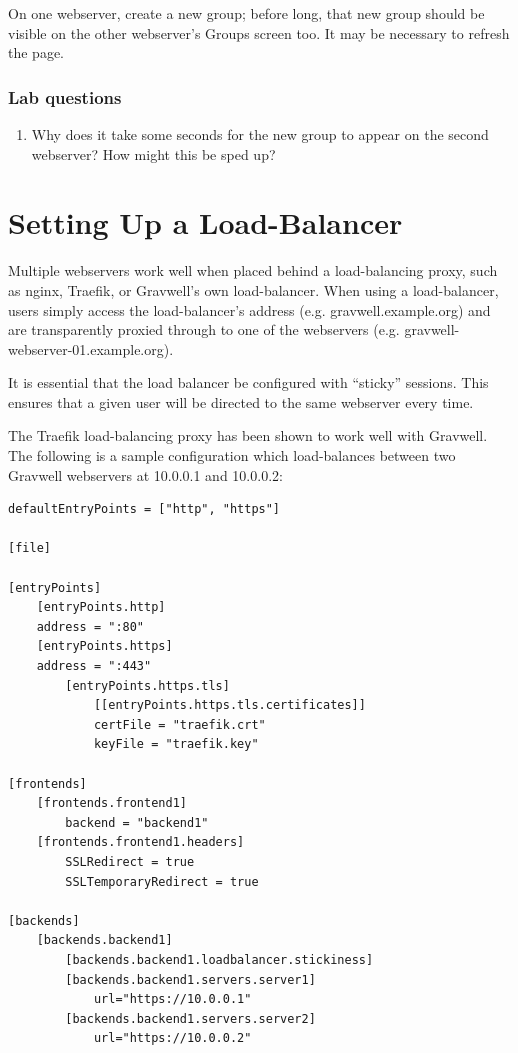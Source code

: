 On one webserver, create a new group; before long, that new group
should be visible on the other webserver's Groups screen too. It may be
necessary to refresh the page.

\subsubsection{Lab questions}

\begin{enumerate}
\item
  Why does it take some seconds for the new group to appear on the
  second webserver? How might this be sped up?
\end{enumerate}

\section{Setting Up a Load-Balancer}
Multiple webservers work well when placed behind a load-balancing
proxy, such as nginx, Traefik, or Gravwell's own load-balancer. 
When using a load-balancer, users simply access
the load-balancer's address (e.g. gravwell.example.org) and are
transparently proxied through to one of the webservers (e.g.
gravwell-webserver-01.example.org).

It is essential that the load balancer be configured with ``sticky''
sessions. This ensures that a given user will be directed to the same
webserver every time.

The Traefik load-balancing proxy has been shown to work well with
Gravwell. The following is a sample configuration which load-balances
between two Gravwell webservers at 10.0.0.1 and 10.0.0.2:

\begin{Verbatim}[breaklines=true]
defaultEntryPoints = ["http", "https"]

[file]

[entryPoints]
    [entryPoints.http]
    address = ":80"
    [entryPoints.https]
    address = ":443"
        [entryPoints.https.tls]
            [[entryPoints.https.tls.certificates]]
            certFile = "traefik.crt"
            keyFile = "traefik.key"

[frontends]
    [frontends.frontend1]
        backend = "backend1"
    [frontends.frontend1.headers]
        SSLRedirect = true
        SSLTemporaryRedirect = true

[backends]
    [backends.backend1]
        [backends.backend1.loadbalancer.stickiness]
        [backends.backend1.servers.server1]
            url="https://10.0.0.1"
        [backends.backend1.servers.server2]
            url="https://10.0.0.2"
\end{Verbatim}
